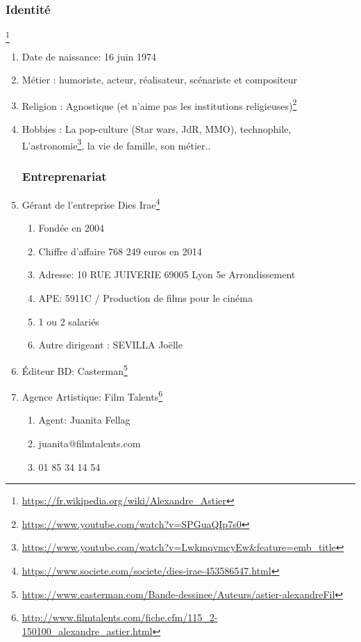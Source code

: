 \subsubsection{Identité}\footnote{\url{https://fr.wikipedia.org/wiki/Alexandre_Astier}}
\begin{enumerate}
\item Date de naissance: 16 juin 1974
\item Métier : humoriste, acteur, réalisateur, scénariste et compositeur
\item Religion : Agnostique (et n’aime pas les institutions religieuses)\footnote{\url{https://www.youtube.com/watch?v=SPGuaQIp7s0}}
\item Hobbies : La pop-culture (Star wars, JdR, MMO), technophile,  L’astronomie\footnote{\url{https://www.youtube.com/watch?v=LwkmqvmcyEw&feature=emb_title}}, la vie de famille, son métier..
\subsubsection{Entreprenariat}
\item Gérant de l’entreprise Dies Irae\footnote{\url{https://www.societe.com/societe/dies-irae-453586547.html}}
\begin{enumerate}
\item Fondée en 2004
\item Chiffre d’affaire 768 249 euros en 2014
\item Adresse: 10 RUE JUIVERIE 69005 Lyon 5e Arrondissement
\item APE: 5911C / Production de films pour le cinéma
\item 1 ou 2 salariés
\item Autre dirigeant : SEVILLA Joëlle
\end{enumerate}
\item Éditeur BD: Casterman\footnote{\url{https://www.casterman.com/Bande-dessinee/Auteurs/astier-alexandreFil}}
\item Agence Artistique: Film Talents\footnote{\url{http://www.filmtalents.com/fiche.cfm/115_2-150100_alexandre_astier.html}}
\begin{enumerate}
\item Agent: Juanita Fellag
\item juanita@filmtalents.com
\item 01 85 34 14 54
\end{enumerate}


\end{enumerate}
